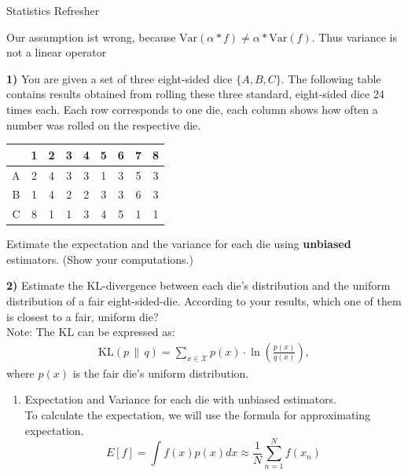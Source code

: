 \documentclass[
	english,
        solution=true
	]{tudaexercise}
\begin{document}
\begin{task}[points=15]{Statistics Refresher}
\begin{subtask}[points=4,title=Expectation and Variance]
\begin{solution}
Our assumption ist wrong, because $\text{Var}(\alpha*f)\ne \alpha * \text{Var}(f)$. Thus variance is not a linear operator
\end{solution}
\end{subtask}


\begin{subtask}[points=4,title=Unbiased Estimators and KL-Divergence]


\textbf{1)} You are given a set of three eight-sided dice $\{A,B,C\}$.
The following table contains results obtained from rolling these three
standard, eight-sided dice 24 times each. Each row corresponds to one die,
each column shows how often a number was rolled on the respective die.

    \begin{center}
    \begin{tabular}{r|cccccccc}
     & 1 & 2 & 3 & 4 & 5 & 6 & 7 & 8 \\ 
        \hline
        \hline
    A & 2 & 4 & 3 & 3 & 1 & 3 & 5 & 3 \\ \hline
    B & 1 & 4 & 2 & 2 & 3 & 3 & 6 & 3 \\ \hline
    C & 8 & 1 & 1 & 3 & 4 & 5 & 1 & 1 
    \end{tabular}
    \end{center}

Estimate the expectation and the variance for each die using \textbf{unbiased} estimators. (Show your computations.)

\textbf{2)} Estimate the KL-divergence between each die's distribution and
 the uniform distribution of a fair eight-sided-die. According to your results, which one of them is
closest to a fair, uniform die?\\
Note: The KL can be expressed as:
\begin{align*}
    \mathrm{KL}(p \,\|\, q) = \sum_{x \in \mathcal{X}} p(x) \cdot \ln \left( \frac{p(x)}{q(x)} \right),
\end{align*}
where $p(x)$ is the fair die’s uniform distribution.

\begin{solution}


\begin{enumerate}
    \item Expectation and Variance for each die with unbiased estimators.\\
    To calculate the expectation, we will use the formula for approximating expectation.
    \[E[f]=\int f(x)p(x)dx \approx \frac{1}{N} \sum^N_{n=1}f(x_n)\]


\end{enumerate}
\end{solution}
\end{subtask}
\end{task}
\end{document}

